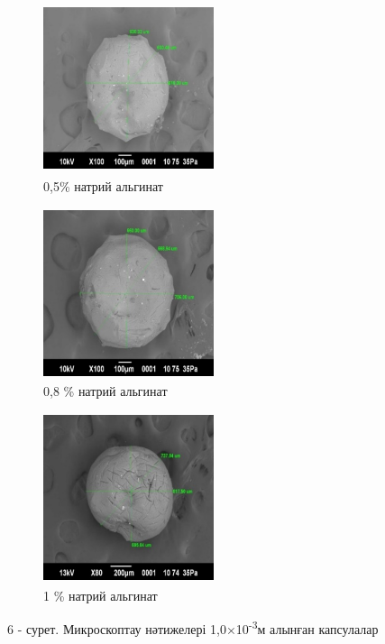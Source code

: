 \begin{figure}[H]
	\centering
	\begin{subfigure}[b]{0.3\textwidth}
		\centering
		\includegraphics[width=5cm,height=5cm]{media/pish/image29}
		\caption*{0,5\% натрий альгинат}
	\end{subfigure}
	\hfill
	\begin{subfigure}[b]{0.3\textwidth}
		\centering
		\includegraphics[width=5cm,height=5cm]{media/pish/image30}
		\caption*{0,8 \% натрий альгинат}
	\end{subfigure}
	\hfill
	\begin{subfigure}[b]{0.3\textwidth}
		\centering
		\includegraphics[width=5cm,height=5cm]{media/pish/image31}
		\caption*{1 \% натрий альгинат}
	\end{subfigure}
	\caption*{6 - сурет. Микроскоптау нәтижелері 1,0×10\textsuperscript{-3}м алынған капсулалар}
\end{figure}

